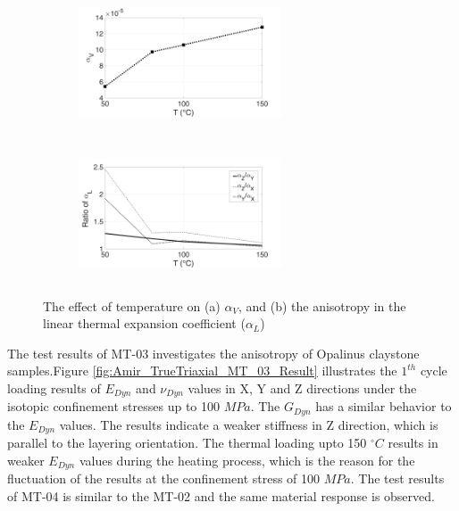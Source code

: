 \begin{figure}[!ht]
\centering
\begin{subfigure}[c]{0.48\textwidth}
\centering
\includegraphics[width=6cm,height=4cm]{figures/Amir_TrueTriaxial_MT_02_Result_1a.png}
\subcaption{}
\label{fig:Amir_TrueTriaxial_MT_02_Result_1a}
\end{subfigure}
\hfill
\begin{subfigure}[c]{0.48\textwidth}
\centering
\includegraphics[width=6cm,height=4cm]{figures/Amir_TrueTriaxial_MT_02_Result_1b.png}
\subcaption{}
\label{fig:Amir_TrueTriaxial_MT_02_Result_1b}
\end{subfigure}
\caption{The effect of temperature on (a) $\alpha_V$, and (b) the anisotropy in the linear thermal expansion coefficient ($\alpha_L$)}
\end{figure}

The test results of MT-03 investigates the anisotropy of Opalinus claystone samples.Figure \ref{fig:Amir_TrueTriaxial_MT_03_Result} illustrates the $1^{th}$ cycle loading results of $E_{Dyn}$ and $\nu_{Dyn}$ values in X, Y and Z directions under the isotopic confinement stresses up to 100 $MPa$. The $G_{Dyn}$ has a similar behavior to the $E_{Dyn}$ values. The results indicate a weaker stiffness in Z direction, which is parallel to the layering orientation. The thermal loading upto 150 $^{\circ}C$ results in weaker $E_{Dyn}$ values during the heating process, which is the reason for the fluctuation of the results at the confinement stress of 100 $MPa$. The test results of MT-04 is similar to the MT-02 and the same material response is observed. 

